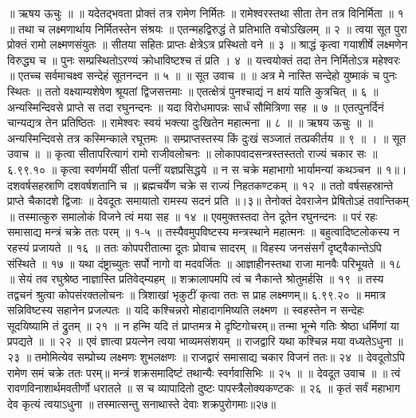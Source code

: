 ॥ ऋषय ऊचुः ॥ ॥
यदेतद्भवता प्रोक्तं तत्र रामेण निर्मितः ॥
रामेश्वरस्तथा सीता तेन तत्र विनिर्मिता ॥ १ ॥
तथा च लक्ष्मणार्थाय निर्मितस्तेन संश्रयः ॥
एतन्महद्विरुद्धं ते प्रतिभाति वचोऽखिलम् ॥ २ ॥
त्वया सूत पुरा प्रोक्तं रामो लक्ष्मणसंयुतः ॥
सीतया सहितः प्राप्तः क्षेत्रेऽत्र प्रस्थितो वने ॥ ३ ॥
श्राद्धं कृत्वा गयाशीर्षे लक्ष्मणेन विरुद्ध्य च ॥
पुनः सम्प्रस्थितोऽरण्यं क्रोधाविष्टश्च तं प्रति । ४ ॥
यत्त्वयोक्तं तदा तेन निर्मितोऽत्र महेश्वरः ॥
एतच्च सर्वमाचक्ष्व सन्देहं सूतनन्दन ॥ ५ ॥
॥ सूत उवाच ॥ ॥
अत्र मे नास्ति सन्देहो युष्माकं च पुनः स्थितः ॥
ततो वक्ष्याम्यशेषेण श्रूयतां द्विजसत्तमाः ॥
एतत्क्षेत्रं पुनश्चाद्यं न क्षयं याति कुत्रचित् ॥ ६ ॥
अन्यस्मिन्दिवसे प्राप्ते स तदा रघुनन्दनः ॥
यदा विरोधमापन्नः सार्धं सौमित्रिणा सह ॥ ७ ॥
एतत्पुनर्दिनं चान्यद्यत्र तेन प्रतिष्ठितः ॥
रामेश्वरः स्वयं भक्त्या दुःखितेन महात्मना ॥ ८ ॥
॥ ऋषय ऊचुः ॥ ॥
अन्यस्मिन्दिवसे तत्र कस्मिन्काले रघूत्तमः ॥
सम्प्राप्तस्तस्य किं दुःखं सञ्जातं तत्प्रकीर्तय ॥ ९ ॥ ।
॥ सूत उवाच ॥ ॥
कृत्वा सीतापरित्यागं रामो राजीवलोचनः ॥
लोकापवादसन्त्रस्तस्ततो राज्यं चकार सः ॥ ६.९९.१० ॥
कृत्वा स्वर्णमयीं सीतां पत्नीं यज्ञप्रसिद्धये ॥
न स चक्रे महाभागो भार्यामन्यां कथञ्चन ॥ १॥।
दशवर्षसहस्राणि दशवर्षशतानि च ॥
ब्रह्मचर्येण चक्रे स राज्यं निहतकण्टकम् ॥ १२ ॥
ततो वर्षसहस्रान्ते प्राप्ते चैकादशे द्विजाः ॥
देवदूतः समायातो रामस्य सदनं प्रति ॥।३॥
तेनोक्तं देवराजेन प्रेषितोऽहं तवान्तिकम् ॥
तस्मात्कुरु समालोकं विजने त्वं मया सह ॥ १४ ॥
एवमुक्तस्तदा तेन दूतेन रघुनन्दनः ॥
परं रहः समासाद्य मन्त्रं चक्रे ततः परम् ॥ १-५ ॥
तस्यैवमुपविष्टस्य मन्त्रस्थाने महात्मनः ॥
बहुत्वादिष्टलोकस्य न रहस्यं प्रजायते ॥ १६ ॥
ततः कोपपरीतात्मा दूतः प्रोवाच सादरम् ॥
विहस्य जनसंसर्गं दृष्ट्वैकान्तेऽपि संस्थिते ॥ १७ ॥
यथा दंष्ट्राच्युतः सर्पो नागो वा मदवर्जितः ॥
आज्ञाहीनस्तथा राजा मानवैः परिभूयते ॥ १८ ॥
सेयं तव रघुश्रेष्ठ नाज्ञास्ति प्रतिवेद्म्यहम् ॥
शक्रालापमपि त्वं च नैकान्ते श्रोतुमर्हसि ॥ १९ ॥
तस्य तद्वचनं श्रुत्वा कोपसंरक्तलोचनः ॥
त्रिशाखां भृकुटीं कृत्वा ततः स प्राह लक्ष्मणम्॥ ६.९९.२० ॥
ममात्र सन्निविष्टस्य सहानेन प्रजल्पतः ॥
यदि कश्चिन्नरो मोहादागमिष्यति लक्ष्मण ॥
स्वहस्तेन न सन्देहः सूदयिष्यामि तं द्रुतम् ॥ २१ ॥
न हन्मि यदि तं प्राप्तमत्र मे दृष्टिगोचरम्॥
तन्मा भून्मे गतिः श्रेष्ठा धर्मिणां या प्रपद्यते ॥ ॥ २२ ॥
एवं ज्ञात्वा प्रयत्नेन त्वया भाव्यमसंशयम् ॥
राजद्वारि यथा कश्चिन्न मया वध्यतेऽधुना ॥ २३ ॥
तमोमित्येव सम्प्रोच्य लक्ष्मणः शुभलक्षणः ॥
राजद्वारं समासाद्य चकार विजनं ततः॥ २४ ॥
देवदूतोऽपि रामेण समं चक्रे ततः परम्॥
मन्त्रं शक्रसमादिष्टं तथान्यैः स्वर्गवासिभिः ॥ २५ ॥
॥ देवदूत उवाच ॥ ॥
त्वं रावणविनाशार्थमवतीर्णो धरातले ॥
स च व्यापादितो दुष्टः पापस्त्रैलोक्यकण्टकः ॥ २६ ॥
कृतं सर्वं महाभाग देव कृत्यं त्वयाऽधुना ॥
तस्मात्सन्तु सनाथास्ते देवाः शक्रपुरोगमाः॥२७॥

